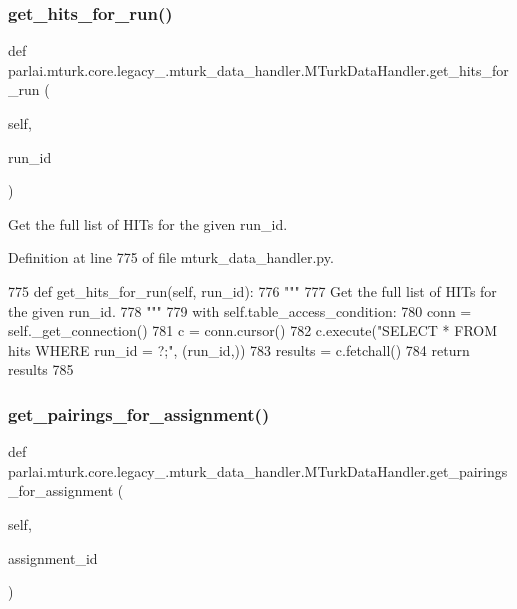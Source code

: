 \subsubsection{\texorpdfstring{get\+\_\+hits\+\_\+for\+\_\+run()}{get\_hits\_for\_run()}}
{\footnotesize\ttfamily def parlai.\+mturk.\+core.\+legacy\+\_.\+mturk\+\_\+data\+\_\+handler.\+M\+Turk\+Data\+Handler.\+get\+\_\+hits\+\_\+for\+\_\+run (\begin{DoxyParamCaption}\item[{}]{self,  }\item[{}]{run\+\_\+id }\end{DoxyParamCaption})}

\begin{DoxyVerb}Get the full list of HITs for the given run_id.
\end{DoxyVerb}
 

Definition at line 775 of file mturk\+\_\+data\+\_\+handler.\+py.


\begin{DoxyCode}
775     \textcolor{keyword}{def }get\_hits\_for\_run(self, run\_id):
776         \textcolor{stringliteral}{"""}
777 \textcolor{stringliteral}{        Get the full list of HITs for the given run\_id.}
778 \textcolor{stringliteral}{        """}
779         with self.table\_access\_condition:
780             conn = self.\_get\_connection()
781             c = conn.cursor()
782             c.execute(\textcolor{stringliteral}{"SELECT * FROM hits WHERE run\_id = ?;"}, (run\_id,))
783             results = c.fetchall()
784             \textcolor{keywordflow}{return} results
785 
\end{DoxyCode}
\mbox{\label{classparlai_1_1mturk_1_1core_1_1legacy__2018_1_1mturk__data__handler_1_1MTurkDataHandler_a1ca83cec6867537d2a72e47beee0ca84}} 
\subsubsection{\texorpdfstring{get\+\_\+pairings\+\_\+for\+\_\+assignment()}{get\_pairings\_for\_assignment()}}
{\footnotesize\ttfamily def parlai.\+mturk.\+core.\+legacy\+\_.\+mturk\+\_\+data\+\_\+handler.\+M\+Turk\+Data\+Handler.\+get\+\_\+pairings\+\_\+for\+\_\+assignment (\begin{DoxyParamCaption}\item[{}]{self,  }\item[{}]{assignment\+\_\+id }\end{DoxyParamCaption})}

